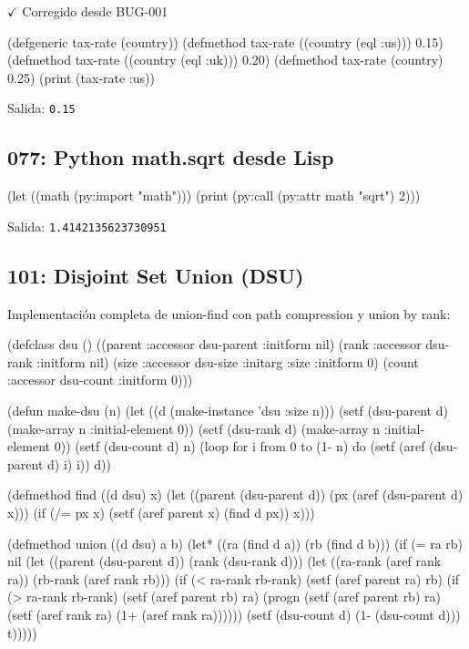 \textcolor{lisppygreen}{$\checkmark$} Corregido desde BUG-001

\begin{lispcode}
(defgeneric tax-rate (country))
(defmethod tax-rate ((country (eql :us))) 0.15)
(defmethod tax-rate ((country (eql :uk))) 0.20)
(defmethod tax-rate (country) 0.25)
(print (tax-rate :us))
\end{lispcode}

Salida: \texttt{0.15}

\subsection*{077: Python math.sqrt desde Lisp}

\begin{lispcode}
(let ((math (py:import "math")))
  (print (py:call (py:attr math "sqrt") 2)))
\end{lispcode}

Salida: \texttt{1.4142135623730951}

\subsection*{101: Disjoint Set Union (DSU)}

Implementación completa de union-find con path compression y union by rank:

\begin{lispcode}
(defclass dsu ()
  ((parent :accessor dsu-parent :initform nil)
   (rank   :accessor dsu-rank   :initform nil)
   (size   :accessor dsu-size   :initarg :size :initform 0)
   (count  :accessor dsu-count  :initform 0)))

(defun make-dsu (n)
  (let ((d (make-instance 'dsu :size n)))
    (setf (dsu-parent d) (make-array n :initial-element 0))
    (setf (dsu-rank d)   (make-array n :initial-element 0))
    (setf (dsu-count d)  n)
    (loop for i from 0 to (1- n) do
      (setf (aref (dsu-parent d) i) i))
    d))

(defmethod find ((d dsu) x)
  (let ((parent (dsu-parent d))
        (px (aref (dsu-parent d) x)))
    (if (/= px x)
        (setf (aref parent x) (find d px))
        x)))

(defmethod union ((d dsu) a b)
  (let* ((ra (find d a))
         (rb (find d b)))
    (if (= ra rb) nil
        (let ((parent (dsu-parent d))
              (rank (dsu-rank d)))
          (let ((ra-rank (aref rank ra))
                (rb-rank (aref rank rb)))
            (if (< ra-rank rb-rank)
                (setf (aref parent ra) rb)
                (if (> ra-rank rb-rank)
                    (setf (aref parent rb) ra)
                    (progn
                      (setf (aref parent rb) ra)
                      (setf (aref rank ra) (1+ (aref rank ra))))))
            (setf (dsu-count d) (1- (dsu-count d))) t)))))
\end{lispcode}


